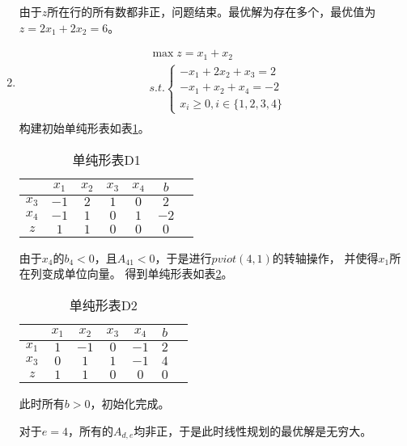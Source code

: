 \begin{solution}
\begin{enumerate}
      由于$z$所在行的所有数都非正，问题结束。最优解为存在多个，最优值为$z = 2x_1 + 2x_2=6$。

      \item 
      \begin{align*}
         &\max z = x_1 + x_2\\
         &s.t. \begin{cases}
            -x_1 + 2x_2 + x_3 = 2\\
            -x_1 + x_2 + x_4 = -2\\
            x_i \ge 0, i \in \{1,2,3,4\}
        \end{cases}\\
      \end{align*}
      构建初始单纯形表如表\ref{td1}。
      \begin{table}[!h]
         \centering
         \caption{单纯形表D1}
         \label{td1}
         \begin{tabular}{c|cccccc} 
         \toprule
                &$x_1$  &$x_2$  &$x_3$  &$x_4$  &$b$   \\\hline
         $x_3$  &$-1$   &$2$    &$1$    &$0$    &$2$   \\
         $x_4$  &$-1$   &$1$    &$0$    &$1$    &$-2$   \\
         $z$    &$1$    &$1$    &$0$    &$0$    &$0$   \\
         \bottomrule
         \end{tabular}
      \end{table}

      由于$x_4$的$b_4<0$，且$A_{41}<0$，于是进行$pviot(4,1)$的转轴操作，
      并使得$x_1$所在列变成单位向量。
      得到单纯形表如表\ref{td2}。

      \begin{table}[!h]
         \centering
         \caption{单纯形表D2}
         \label{td2}
         \begin{tabular}{c|cccccc} 
            \toprule
                   &$x_1$  &$x_2$  &$x_3$  &$x_4$  &$b$   \\\hline
            $x_1$  &$1$    &$-1$   &$0$    &$-1$   &$2$   \\
            $x_3$  &$0$    &$1$    &$1$    &$-1$    &$4$   \\
            $z$    &$1$    &$1$    &$0$    &$0$    &$0$   \\
            \bottomrule
            \end{tabular}
      \end{table}

      此时所有$b>0$，初始化完成。

      对于$e=4$，所有的${A}_{d,e}$均非正，于是此时线性规划的最优解是无穷大。
      
   \end{enumerate}
\end{solution}